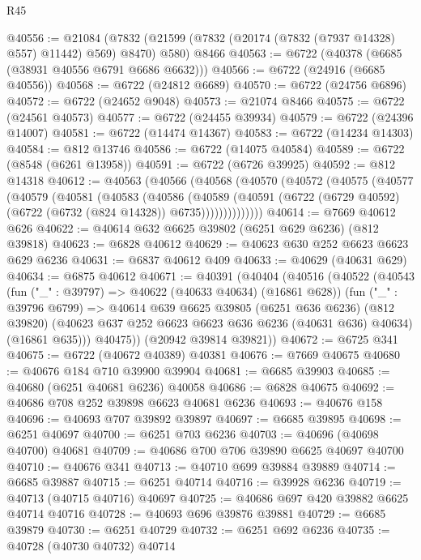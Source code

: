 \begin{lexlean}{R45}
\begin{coremodule}
{@40556 := @21084
    (@7832 (@21599 (@7832 (@20174 (@7832 (@7937 @14328) @557) @11442) @569) @8470) @580)
    @8466
@40563 := @6722 (@40378 (@6685 (@38931 @40556 @6791 @6686 @6632)))
@40566 := @6722 (@24916 (@6685 @40556))
@40568 := @6722 (@24812 @6689)
@40570 := @6722 (@24756 @6896)
@40572 := @6722 (@24652 @9048)
@40573 := @21074 @8466
@40575 := @6722 (@24561 @40573)
@40577 := @6722 (@24455 @39934)
@40579 := @6722 (@24396 @14007)
@40581 := @6722 (@14474 @14367)
@40583 := @6722 (@14234 @14303)
@40584 := @812 @13746
@40586 := @6722 (@14075 @40584)
@40589 := @6722 (@8548 (@6261 @13958))
@40591 := @6722 (@6726 @39925)
@40592 := @812 @14318
@40612 := @40563
    (@40566
      (@40568
        (@40570
          (@40572
            (@40575
              (@40577
                (@40579
                  (@40581
                    (@40583
                      (@40586
                        (@40589
                          (@40591
                            (@6722 (@6729 @40592) (@6722 (@6732 (@824 @14328)) @6735))))))))))))))
@40614 := @7669 @40612 @626
@40622 := @40614 @632 @6625 @39802 (@6251 @629 @6236) (@812 @39818)
@40623 := @6828 @40612
@40629 := @40623 @630 @252 @6623 @6623 @629 @6236
@40631 := @6837 @40612 @409
@40633 := @40629 (@40631 @629)
@40634 := @6875 @40612
@40671 := @40391
    (@40404
      (@40516
        (@40522
          (@40543
            (fun ("_" : @39797) => @40622 (@40633 @40634) (@16861 @628))
            (fun ("_" : @39796 @6799) =>
            @40614
              @639
              @6625
              @39805
              (@6251 @636 @6236)
              (@812 @39820)
              (@40623 @637 @252 @6623 @6623 @636 @6236 (@40631 @636) @40634)
              (@16861 @635)))
          @40475))
      (@20942 @39814 @39821))
@40672 := @6725 @341
@40675 := @6722 (@40672 @40389) @40381
@40676 := @7669 @40675
@40680 := @40676 @184 @710 @39900 @39904
@40681 := @6685 @39903
@40685 := @40680 (@6251 @40681 @6236) @40058
@40686 := @6828 @40675
@40692 := @40686 @708 @252 @39898 @6623 @40681 @6236
@40693 := @40676 @158
@40696 := @40693 @707 @39892 @39897
@40697 := @6685 @39895
@40698 := @6251 @40697
@40700 := @6251 @703 @6236
@40703 := @40696 (@40698 @40700) @40681
@40709 := @40686 @700 @706 @39890 @6625 @40697 @40700
@40710 := @40676 @341
@40713 := @40710 @699 @39884 @39889
@40714 := @6685 @39887
@40715 := @6251 @40714
@40716 := @39928 @6236
@40719 := @40713 (@40715 @40716) @40697
@40725 := @40686 @697 @420 @39882 @6625 @40714 @40716
@40728 := @40693 @696 @39876 @39881
@40729 := @6685 @39879
@40730 := @6251 @40729
@40732 := @6251 @692 @6236
@40735 := @40728 (@40730 @40732) @40714
}
\end{coremodule}
\end{lexlean}
